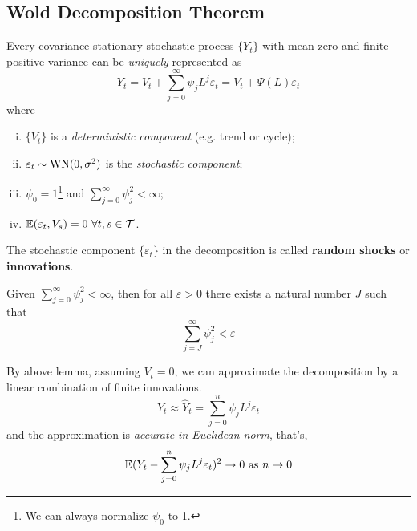 \documentclass[11pt]{article}
\begin{document}
		\subsection{Wold Decomposition Theorem}
			\begin{theorem}
				Every covariance stationary stochastic process $\{Y_t\}$ with mean zero and finite positive variance can be \emph{uniquely} represented as
				\begin{equation}
					Y_t = V_t + \sum_{j=0}^\infty \psi_j L^j \varepsilon_t = V_t + \Psi(L)\varepsilon_t
				\end{equation}
				where 
				\begin{enumerate}[(i)]
					\item $\{V_t\}$ is a \emph{deterministic component} (e.g. trend or cycle);
					\item $\varepsilon_t \sim \text{{WN}}(0, \sigma^2)$ is the \emph{stochastic component};
					\item $\psi_0 = 1$\footnote{We can always normalize $\psi_0$ to 1.} and $\sum_{j=0}^\infty \psi_j^2 < \infty$;
					\item $\expect{\varepsilon_t, V_s} = 0\ \forall t, s \in \mc{T}$.
				\end{enumerate}
			\end{theorem}
			\begin{definition}
				The stochastic component $\{\varepsilon_t\}$ in the decomposition is called \textbf{random shocks} or \textbf{innovations}.
			\end{definition}
			
			\begin{lemma}
				Given $\sum_{j=0}^\infty \psi_j^2 < \infty$, then for all $\varepsilon > 0$ there exists a natural number $J$ such that
				\begin{equation}
					\sum_{j=J}^\infty \psi_j^2 < \varepsilon
				\end{equation}
			\end{lemma}
			
			\begin{corollary}
				By above lemma, assuming $V_t = 0$, we can approximate the decomposition by a linear combination of finite innovations.
				\begin{equation}
					Y_t \approx \hat{Y}_t = \sum_{j=0}^n \psi_j L^j \varepsilon_t
				\end{equation}
				and the approximation is \emph{accurate in Euclidean norm}, that's,
				\begin{equation}
					\mathbb{E}({Y_t -\sum_{j=0}^n \psi_j L^j \varepsilon_t})^2 \rightarrow 0 \text{{ as }} n \to 0
				\end{equation}
			\end{corollary}
\end{document}
